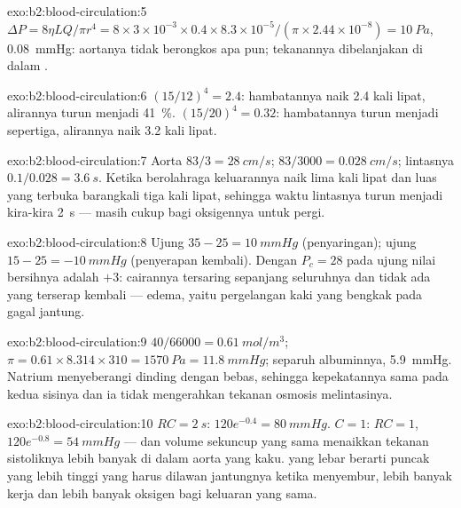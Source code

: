 \begin{solution}{exo:b2:blood-circulation:5}
$\Delta P = 8\eta LQ/\pi r^{4} = 8\times 3\times 10^{-3}\times
0.4\times 8.3\times 10^{-5}/(\pi\times 2.44\times 10^{-8}) =
\qty{10}{Pa}$, \qty{0.08}{mmHg}: aortanya tidak berongkos apa pun;
tekanannya dibelanjakan di dalam .
\end{solution}

\begin{solution}{exo:b2:blood-circulation:6}
$(15/12)^{4} = 2.4$: hambatannya naik 2.4 kali lipat, alirannya turun
menjadi \qty{41}{\%}. $(15/20)^{4} = 0.32$: hambatannya turun menjadi
sepertiga, alirannya naik 3.2 kali lipat.
\end{solution}

\begin{solution}{exo:b2:blood-circulation:7}
Aorta $83/3 = \qty{28}{cm/s}$;  $83/3000 =
\qty{0.028}{cm/s}$; lintasnya $0.1/0.028 = \qty{3.6}{s}$. Ketika
berolahraga keluarannya naik lima kali lipat dan luas  yang
terbuka barangkali tiga kali lipat, sehingga waktu lintasnya turun
menjadi kira-kira \qty{2}{s} --- masih cukup bagi oksigennya untuk pergi.
\end{solution}

\begin{solution}{exo:b2:blood-circulation:8}
Ujung  $35 - 25 = \qty{+10}{mmHg}$ (penyaringan); ujung  $15
- 25 = \qty{-10}{mmHg}$ (penyerapan kembali). Dengan $P_c = 28$ pada ujung
 nilai bersihnya adalah $+3$: cairannya tersaring sepanjang
seluruhnya dan tidak ada yang terserap kembali --- edema, yaitu pergelangan kaki yang bengkak pada gagal jantung.
\end{solution}

\begin{solution}{exo:b2:blood-circulation:9}
$40/66000 = \qty{0.61}{mol/m^3}$; $\pi = 0.61\times 8.314\times 310 =
\qty{1570}{Pa} = \qty{11.8}{mmHg}$; separuh albuminnya, \qty{5.9}{mmHg}.
Natrium menyeberangi dinding  dengan bebas, sehingga
kepekatannya sama pada kedua sisinya dan ia tidak mengerahkan tekanan
osmosis melintasinya.
\end{solution}

\begin{solution}{exo:b2:blood-circulation:10}
$RC = \qty{2}{s}$: $120e^{-0.4} = \qty{80}{mmHg}$. $C = 1$: $RC = 1$,
$120e^{-0.8} = \qty{54}{mmHg}$ --- dan volume sekuncup yang sama
menaikkan tekanan sistoliknya lebih banyak di dalam aorta yang kaku.
 yang lebar berarti puncak yang lebih tinggi yang harus
dilawan jantungnya ketika menyembur, lebih banyak kerja dan lebih
banyak oksigen bagi keluaran yang sama.
\end{solution}

